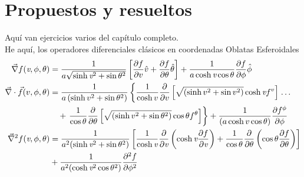 \documentclass[../main.tex]{subfiles}
\begin{document}
\section{Propuestos y resueltos}
Aquí van ejercicios varios del capítulo completo.\\
 He aquí, los operadores diferenciales clásicos en coordenadas Oblatas Esferoidales
\begin{align}
     \vec{\nabla} f(\emph{v},\phi,\theta) & =\frac{1}{a\sqrt{\sinh{\emph{v}}^2+\sin{\theta}^2}}\left[ \frac{\partial f}{\partial v}\hat{v}+ \frac{\partial f}{\partial \theta} \hat{\theta} \right]+\frac{1}{a\cosh{\emph{v}}\cos{\theta}}\frac{\partial f}{\partial \phi}\hat{\phi} \\
\vec{\nabla} \cdot \vec{f}(v, \phi, \theta) & = \frac{1}{ a\left( \sinh v^2 + \sin{\theta}^2\right)} \left\{ \frac{1}{\cosh v} \frac{\partial}{\partial v} \left[\sqrt{ (\sinh v^2 + \sin v^2)} \cosh{\emph{v}} f^v \right] \right. \dots \nonumber \\
&\quad+ \left. \frac{1}{\cos \theta} \frac{\partial}{\partial \theta} \left[ \sqrt{(\sinh v^2 + \sin \theta^2)} \cos{\theta} f^\theta \right] \right\}
+ \frac{1}{(a\cosh v \cos \theta)} \frac{\partial f^\phi}{\partial \phi} \\ 
    \vec{\nabla}^2 f(\emph{v},\phi,\theta) & = \frac{1}{a^2(\sinh{\emph{v}^2+\sin{\theta}^2})} \left[ \frac{1}{\cosh{\emph{v}}} \frac{\partial }{\partial \emph{v}}\left(  
     \cosh{\emph{v}}\frac{\partial f}{\partial \emph{v}} \right) + \frac{1}{\cos{\theta}} \frac{\partial}{\partial \theta} \left( 
      \cos{\theta} \frac{\partial f}{\partial \theta}  \right)\right] \\
      & + \frac{1}{a^2(\cosh{\emph{v}}^2\cos{\theta}^2)}\frac{\partial^2f}{\partial\phi^2}
\end{align}
\end{document}
